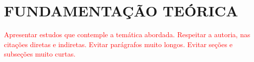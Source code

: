 \chapter{FUNDAMENTAÇÃO TEÓRICA}

\textcolor{red}{Apresentar estudos que contemple a temática abordada. Respeitar a autoria,
nas citações diretas e indiretas. Evitar parágrafos muito longos. Evitar seções e
subseções muito curtas.}
